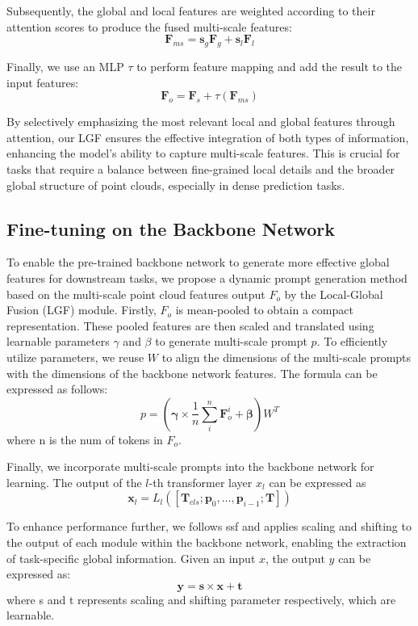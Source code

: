 Subsequently, the global and local features are weighted according to their attention scores to produce the fused multi-scale features:
\begin{equation}
    \boldsymbol{F}_{ms} = \boldsymbol{s}_g \boldsymbol{F}_g + \boldsymbol{s}_l \boldsymbol{F}_l
\end{equation}

Finally, we use an MLP $\tau$ to perform feature mapping and add the result to the input features:
\begin{equation}
     \boldsymbol{F}_{o} = \boldsymbol{F}_s + \tau \left( \boldsymbol{F}_{ms} \right)
\end{equation}

By selectively emphasizing the most relevant local and global features through attention, our LGF ensures the effective integration of both types of information, enhancing the model's ability to capture multi-scale features. This is crucial for tasks that require a balance between fine-grained local details and the broader global structure of point clouds, especially in dense prediction tasks.

\subsection{Fine-tuning on the Backbone Network}
To enable the pre-trained backbone network to generate more effective global features for downstream tasks, we propose a dynamic prompt generation method based on the multi-scale point cloud features output $F_{o}$ by the Local-Global Fusion (LGF) module. Firstly, $F_{o}$ is mean-pooled to obtain a compact representation. These pooled features are then scaled and translated using learnable parameters $\gamma$ and $\beta$ to generate multi-scale prompt $p$. To efficiently utilize parameters, we reuse $W$ to align the dimensions of the multi-scale prompts with the dimensions of the backbone network features. The formula can be expressed as follows:
\begin{equation}
    p = \left( \boldsymbol{\gamma} \times \frac{1}{n}\sum_i^n{\boldsymbol{F}_{o}^i} + \boldsymbol{\beta} \right) W^T
\end{equation}
where n is the num of tokens in $F_o$.

Finally, we incorporate multi-scale prompts into the backbone network for learning. The output of the $l$-th transformer layer $x_l$ can be expressed as
\begin{equation}
    \boldsymbol{x}_l=L_l\left(\left[\boldsymbol{T}_{c l s} ; \boldsymbol{p}_{0}, \ldots, \boldsymbol{p}_{i-1} ; \boldsymbol{T}\right]\right)
\end{equation}

To enhance performance further, we follows ssf\cite{lian2022scaling} and applies scaling and shifting to the output of each module within the backbone network, enabling the extraction of task-specific global information. Given an input $x$, the output $y$ can be expressed as:
\begin{equation}
    \boldsymbol{y} = \boldsymbol{s} \times \boldsymbol{x} + \boldsymbol{t}
\end{equation}
where s and t represents scaling and shifting parameter respectively, which are learnable.
